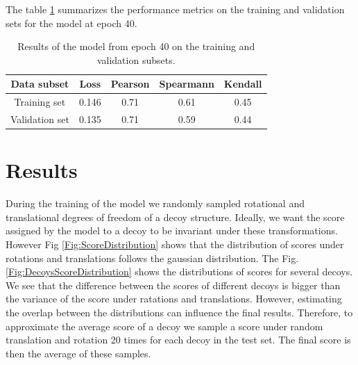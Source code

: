 \documentclass[a4paper,10pt]{article}
\begin{document}
The table \ref{Tbl:TrainingResults} summarizes the performance metrics on the training and validation sets for the model at epoch 40.

\begin{table}[H]
\begin{center}
\begin{tabular}{ c | c | c | c | c }
    Data subset & Loss & Pearson & Spearmann & Kendall \\
    \hline
    Training set     &0.146 &0.71 &0.61 &0.45 \\
    Validation set   &0.135 &0.71 &0.59 &0.44 \\ \hline

\end{tabular}
  \caption {Results of the model from epoch 40 on the training and validation subsets.}
    \label{Tbl:TrainingResults}
\end{center}
\end{table}

\section{Results}
During the training of the model we randomly sampled rotational and translational degrees of freedom of a decoy structure. Ideally, we 
want the score assigned by the model to a decoy to be invariant under these transformations. However Fig \ref{Fig:ScoreDistribution} 
shows that the distribution
of scores under rotations and translations follows the gaussian distribution. The Fig. \ref{Fig:DecoysScoreDistribution} 
shows the distributions of scores for several decoys. We see that the difference between the scores of different decoys is 
bigger than the variance of the score under ratations and translations. However, estimating the overlap between 
the distributions can influence the final results. Therefore, to approximate the average score of a decoy we 
sample a score under random translation and rotation 20 times for each decoy in the test set. The final score is then the average of these 
samples.
\end{document}
